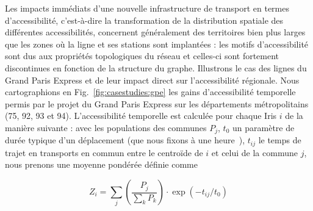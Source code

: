 

Les impacts immédiats d'une nouvelle infrastructure de transport en termes d'accessibilité, c'est-à-dire la transformation de la distribution spatiale des différentes accessibilités, concernent généralement des territoires bien plus larges que les zones où la ligne et ses stations sont implantées : les motifs d'accessibilité sont dus aux propriétés topologiques du réseau et celles-ci sont fortement discontinues en fonction de la structure du graphe. Illustrons le cas des lignes du Grand Paris Express et de leur impact direct sur l'accessibilité régionale. Nous cartographions en Fig.~\ref{fig:casestudies:gpe} les gains d'accessibilité temporelle permis par le projet du Grand Paris Express sur les départements métropolitains (75, 92, 93 et 94). L'accessibilité temporelle est calculée pour chaque Iris $i$ de la manière suivante : avec les populations des communes $P_j$, $t_0$ un paramètre de durée typique d'un déplacement (que nous fixons à une heure~\cite{zahavi1980regularities}), $t_{ij}$ le temps de trajet en transports en commun entre le centroïde de $i$ et celui de la commune $j$, nous prenons une moyenne pondérée définie comme

\[
Z_i = \sum_j \left(\frac{P_j}{\sum_k P_k}\right)\cdot \exp\left(- t_{ij}/t_0\right)
\]

